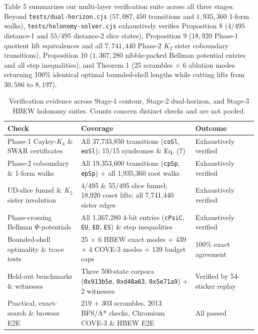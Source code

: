 \documentclass[10pt,twocolumn,letterpaper]{article}
\begin{document}
Table 5 summarizes our multi-layer verification suite across all three
stages. Beyond \texttt{tests/dual-horizon.cjs} (\(57,087,450\)
transitions and \(1,935,360\) 1-form walks),
\texttt{tests/holonomy-solver.cjs} exhaustively verifies Proposition 8
(\(4/495\) distance-1 and \(55/495\) distance-2 slice states),
Proposition 9 (\(18,920\) Phase-1 quotient lift equivalences and all
\(7,741,440\) Phase-2 \(K_2\) sister coboundary transitions),
Proposition 10 (\(1,367,280\) nibble-packed Bellman potential entries
and all step inequalities), and Theorem 1 (\(25\) scrambles \(\times\)
\(6\) ablation modes returning 100\% identical optimal bounded-shell
lengths while cutting lifts from \(30,586\) to \(8,197\)).

\begin{table}[t]
\caption{Verification evidence across Stage-1 contour, Stage-2 dual-horizon, and Stage-3 HBEW holonomy suites. Counts concern distinct checks and are not pooled.}
\centering\small
\begin{tabularx}{\textwidth}{@{}p{}Lp{0.22\textwidth}@{}}
\toprule
Check & Coverage & Outcome \\
\midrule
Phase-1 Cayley-\(K_4\) \& SWAR certificates & All 37,733,850 transitions (\texttt{coSl}, \texttt{eoSl}); 15/15
syndromes \& Eq. (7) & Exhaustively verified \\
Phase-2 coboundary \& 1-form walks & All 19,353,600 transitions (\texttt{cpSp}, \texttt{epSp}) + all
1,935,360 root walks & Exhaustively verified \\
UD-slice funnel \& \(K_2\) sister involution & 4/495 \& 55/495 slice funnel; 18,920 coset lifts; all 7,741,440 sister
edges & Exhaustively verified \\
Phase-crossing Bellman \(\Psi\)-potentials & All 1,367,280 4-bit entries (\texttt{cPsiC}, \texttt{EU}, \texttt{ED},
\texttt{ES}) \& step inequalities & Exhaustively verified \\
Bounded-shell optimality \& trace tests & 25 \(\times\) 6 HBEW exact modes + 439 \(\times\) 4 COVE-3 modes + 139
budget caps & 100\% exact agreement \\
Held-out benchmarks \& witnesses & Three 500-state corpora (\texttt{0x913b5e}, \texttt{0xd48a63},
\texttt{0x5e71a9}) + 2 witnesses & Verified by 54-sticker replay \\
Practical, exact-search \& browser E2E & 219 + 303 scrambles, 2013 BFS/A* checks, Chromium COVE-3 \& HBEW E2E & All passed \\
\bottomrule
\end{tabularx}
\end{table}
\end{document}
